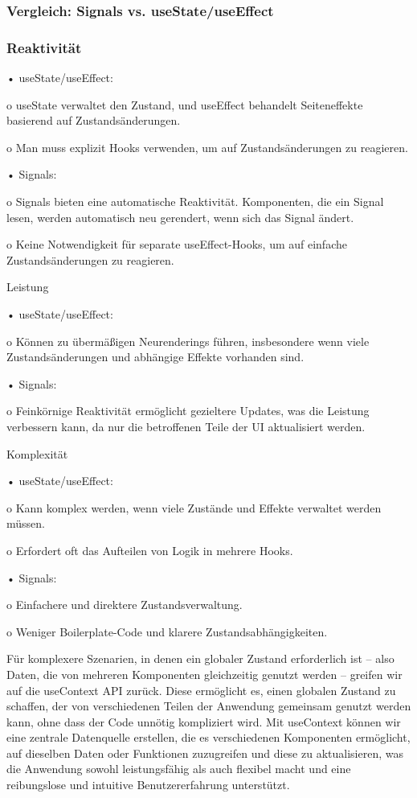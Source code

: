 \documentclass[12pt,a4paper]{article} %
\begin{document}
\subsubsection{Vergleich: Signals vs. useState/useEffect} 
\subsubsection{ Reaktivität}

•	useState/useEffect:

o	useState verwaltet den Zustand, und useEffect behandelt Seiteneffekte basierend auf Zustandsänderungen.

o	Man muss explizit Hooks verwenden, um auf Zustandsänderungen zu reagieren.

•	Signals:

o	Signals bieten eine automatische Reaktivität. Komponenten, die ein Signal lesen, werden automatisch neu gerendert, wenn sich das Signal ändert.

o	Keine Notwendigkeit für separate useEffect-Hooks, um auf einfache Zustandsänderungen zu reagieren.


Leistung

•	useState/useEffect:

o	Können zu übermäßigen Neurenderings führen, insbesondere wenn viele Zustandsänderungen und abhängige Effekte vorhanden sind.

•	Signals:

o	Feinkörnige Reaktivität ermöglicht gezieltere Updates, was die Leistung verbessern kann, da nur die betroffenen Teile der UI aktualisiert werden.


Komplexität

•	useState/useEffect:

o	Kann komplex werden, wenn viele Zustände und Effekte verwaltet werden müssen.

o	Erfordert oft das Aufteilen von Logik in mehrere Hooks.

•	Signals:

o	Einfachere und direktere Zustandsverwaltung.

o	Weniger Boilerplate-Code und klarere Zustandsabhängigkeiten.



Für komplexere Szenarien, in denen ein globaler Zustand erforderlich ist – also Daten, die von mehreren Komponenten gleichzeitig genutzt werden – greifen wir auf die useContext API zurück. Diese ermöglicht es, einen globalen Zustand zu schaffen, der von verschiedenen Teilen der Anwendung gemeinsam genutzt werden kann, ohne dass der Code unnötig kompliziert wird. Mit useContext können wir eine zentrale Datenquelle erstellen, die es verschiedenen Komponenten ermöglicht, auf dieselben Daten oder Funktionen zuzugreifen und diese zu aktualisieren, was die Anwendung sowohl leistungsfähig als auch flexibel macht und eine reibungslose und intuitive Benutzererfahrung unterstützt.
\end{document}
